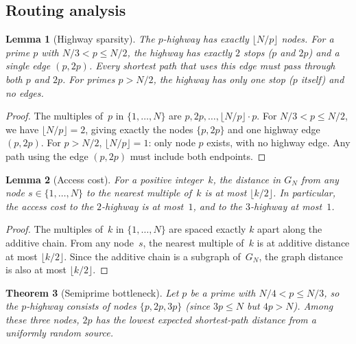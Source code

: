 \documentclass[11pt]{article}
\theoremstyle{plain}
\newtheorem{theorem}{Theorem}[section]
\newtheorem{lemma}[theorem]{Lemma}
\theoremstyle{definition}
\begin{document}
\subsection{Routing analysis}

\begin{lemma}[Highway sparsity]\label{lem:sparsity}
The $p$-highway has exactly $\lfloor N/p \rfloor$ nodes. For a prime
$p$ with $N/3 < p \le N/2$, the highway has exactly $2$ stops ($p$ and $2p$)
and a single edge $(p, 2p)$.
Every shortest path that uses this edge must pass through both $p$ and $2p$.
For primes $p > N/2$, the highway has only one stop ($p$ itself) and no edges.
\end{lemma}

\begin{proof}
The multiples of~$p$ in $\{1, \ldots, N\}$ are $p, 2p, \ldots, \lfloor N/p \rfloor \cdot p$.
For $N/3 < p \le N/2$, we have $\lfloor N/p \rfloor = 2$, giving exactly
the nodes $\{p, 2p\}$ and one highway edge $(p, 2p)$.
For $p > N/2$, $\lfloor N/p \rfloor = 1$: only node $p$ exists, with no highway edge.
Any path using the edge $(p, 2p)$ must include both endpoints.
\end{proof}

\begin{lemma}[Access cost]\label{lem:access}
For a positive integer~$k$, the distance in $G_N$ from any node
$s \in \{1, \ldots, N\}$ to the nearest multiple of~$k$ is at most
$\lfloor k/2 \rfloor$.
In particular, the access cost to the $2$-highway is at most~$1$,
and to the $3$-highway at most~$1$.
\end{lemma}

\begin{proof}
The multiples of~$k$ in $\{1, \ldots, N\}$ are spaced exactly $k$ apart
along the additive chain. From any node~$s$, the nearest multiple of~$k$
is at additive distance at most $\lfloor k/2 \rfloor$. Since the additive
chain is a subgraph of~$G_N$, the graph distance is also at most
$\lfloor k/2 \rfloor$.
\end{proof}

\begin{theorem}[Semiprime bottleneck]\label{thm:bottleneck}
Let $p$ be a prime with $N/4 < p \le N/3$, so the $p$-highway consists
of nodes $\{p, 2p, 3p\}$ (since $3p \le N$ but $4p > N$).
Among these three nodes, $2p$ has the lowest expected shortest-path distance
from a uniformly random source.
\end{theorem}
\end{document}
